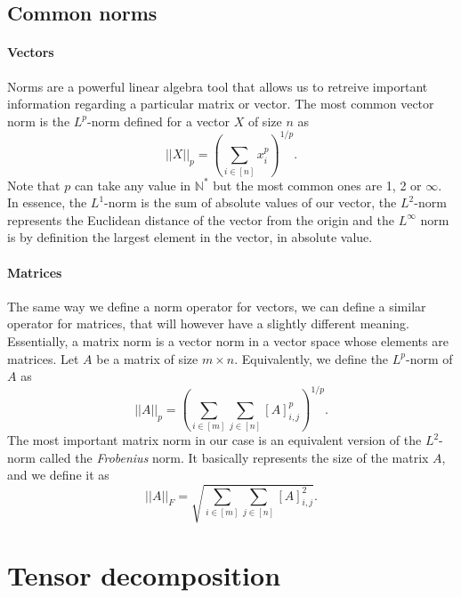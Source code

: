 \subsection{Common norms}
\paragraph{Vectors} Norms are a powerful linear algebra tool that allows us to retreive important information regarding a particular matrix or vector. The most common vector norm is the $L^p$-norm defined for a vector $X$ of size $n$ as 
\begin{equation}
    ||X||_p=\left(\sum_{i\in[n]}x_i^p\right)^{1/p}.
\end{equation}
Note that $p$ can take any value in $\mathbb{N}^*$ but the most common ones are 1, 2 or $\infty$. In essence, the $L^1$-norm is the sum of absolute values of our vector, the $L^2$-norm represents the Euclidean distance of the vector from the origin and the $L^\infty$ norm is by definition the largest element in the vector, in absolute value.
\paragraph{Matrices} The same way we define a norm operator for vectors, we can define a similar operator for matrices, that will however have a slightly different meaning. Essentially, a matrix norm is a vector norm in a vector space whose elements are matrices. Let $A$ be a matrix of size $m\times n$. Equivalently, we define the $L^p$-norm of $A$ as 
\begin{equation}
    ||A||_p=\left(\sum_{i\in[m]}\sum_{j\in[n]}[A]_{i,j}^p\right)^{1/p}.
\end{equation}
The most important matrix norm in our case is an equivalent version of the $L^2$-norm called the \textit{Frobenius} norm. It basically represents the size of the matrix $A$, and we define it as 
\begin{equation}
    ||A||_F=\sqrt{\sum_{i\in[m]}\sum_{j\in[n]}[A]_{i,j}^2}.
\end{equation}

\section{Tensor decomposition}
